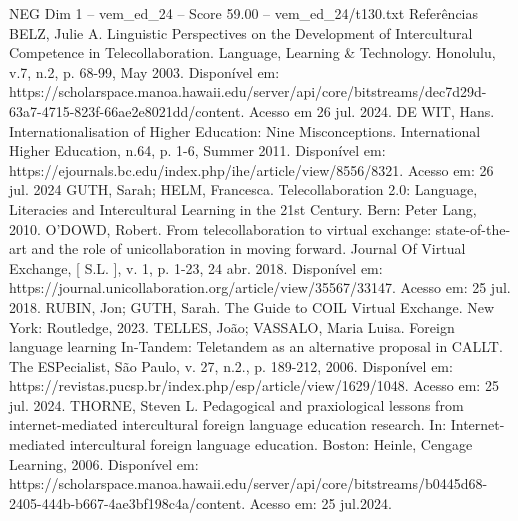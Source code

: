 \begin{textsample}{NEG Dim 1 – vem\_ed\_24 – Score 59.00 – vem\_ed\_24/t130.txt}
Referências BELZ, Julie A.
Linguistic Perspectives on the Development of Intercultural Competence in Telecollaboration.
Language, Learning \& Technology.
Honolulu, v.7, n.2, p. 68-99, May 2003.
Disponível em: https://scholarspace.manoa.hawaii.edu/server/api/core/bitstreams/dec7d29d-63a7-4715-823f-66ae2e8021dd/content.
Acesso em 26 jul. 2024.
DE WIT, Hans.
Internationalisation of Higher Education: Nine Misconceptions.
International Higher Education, n.64, p. 1-6, Summer 2011.
Disponível em: https://ejournals.bc.edu/index.php/ihe/article/view/8556/8321.
Acesso em: 26 jul. 2024 GUTH, Sarah; HELM, Francesca.
Telecollaboration 2.0: Language, Literacies and Intercultural Learning in the 21st Century.
Bern: Peter Lang, 2010.
O'DOWD, Robert.
From telecollaboration to virtual exchange: state-of-the-art and the role of unicollaboration in moving forward.
Journal Of Virtual Exchange, [ S.L. ], v. 1, p. 1-23, 24 abr. 2018.
Disponível em: https://journal.unicollaboration.org/article/view/35567/33147.
Acesso em: 25 jul. 2018.
RUBIN, Jon; GUTH, Sarah.
The Guide to COIL Virtual Exchange.
New York: Routledge, 2023.
TELLES, João; VASSALO, Maria Luisa.
Foreign language learning In-Tandem: Teletandem as an alternative proposal in CALLT.
The ESPecialist, São Paulo, v. 27, n.2., p. 189-212, 2006.
Disponível em: https://revistas.pucsp.br/index.php/esp/article/view/1629/1048.
Acesso em: 25 jul. 2024.
THORNE, Steven L.
Pedagogical and praxiological lessons from internet-mediated intercultural foreign language education research.
In: Internet-mediated intercultural foreign language education.
Boston: Heinle, Cengage Learning, 2006.
Disponível em: https://scholarspace.manoa.hawaii.edu/server/api/core/bitstreams/b0445d68-2405-444b-b667-4ae3bf198c4a/content.
Acesso em: 25 jul.2024.

\end{textsample}
